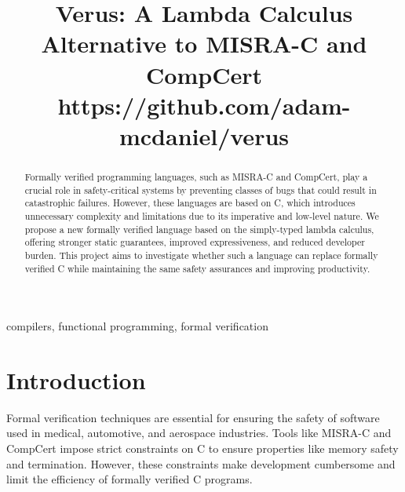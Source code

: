 \documentclass[conference]{IEEEtran}
\begin{document}
\title{Verus: A Lambda Calculus Alternative to MISRA-C and CompCert\\
{\footnotesize https://github.com/adam-mcdaniel/verus}}

\author{
\and
{}
}

\maketitle

\begin{abstract}
Formally verified programming languages, such as MISRA-C and CompCert, play a crucial role in safety-critical systems by preventing classes of bugs that could result in catastrophic failures. However, these languages are based on C, which introduces unnecessary complexity and limitations due to its imperative and low-level nature. We propose a new formally verified language based on the simply-typed lambda calculus, offering stronger static guarantees, improved expressiveness, and reduced developer burden. This project aims to investigate whether such a language can replace formally verified C while maintaining the same safety assurances and improving productivity.
\end{abstract}

\begin{IEEEkeywords}
compilers, functional programming, formal verification
\end{IEEEkeywords}

\section{Introduction}
Formal verification techniques are essential for ensuring the safety of software used in medical, automotive, and aerospace industries. Tools like MISRA-C and CompCert impose strict constraints on C to ensure properties like memory safety and termination. However, these constraints make development cumbersome and limit the efficiency of formally verified C programs. 
\end{document}
